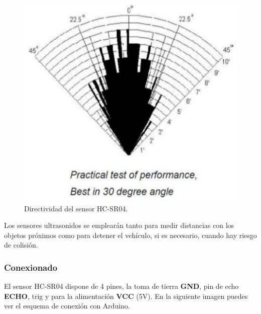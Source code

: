 \begin{figure}[H]
  \begin{center}
    \includegraphics[scale=0.3]{imagenes/ultrasonido_directividad.jpg}
  \end{center}
  \caption{Directividad del sensor HC-SR04.}
  \label{figura:rpi-modulo-bateria}
\end{figure}

Los sensores ultrasonidos se emplearán tanto para medir distancias con los objetos próximos
como para detener el vehículo, si es necesario, cuando hay riesgo de colisión.\\

\subsubsection{Conexionado}

El sensor HC-SR04 dispone de 4 pines, la toma de tierra \textbf{GND}, pin de echo \textbf{ECHO}, trig  y para la alimentación \textbf{VCC} 
(5V). En la siguiente imagen puedes ver el esquema de conexión con Arduino.

